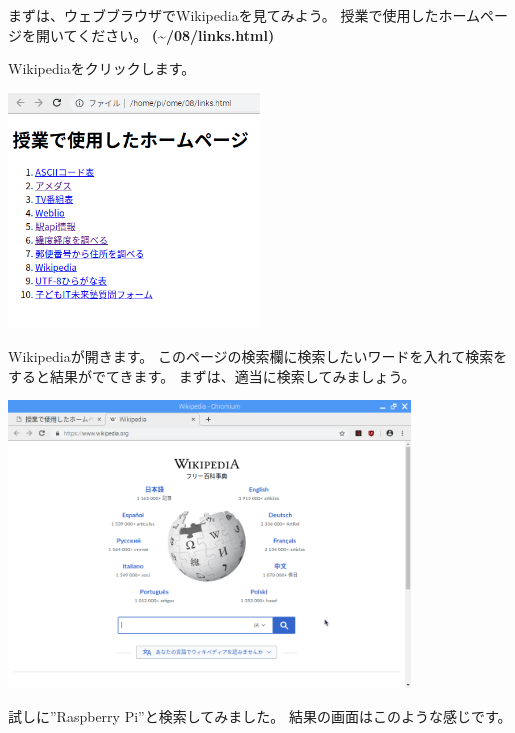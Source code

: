 まずは、ウェブブラウザでWikipediaを見てみよう。
授業で使用したホームページを開いてください。
\textbf{({\textasciitilde}/08/links.html)}

Wikipediaをクリックします。



\begin{center}
\includegraphics[width=0.5\textwidth]{./text08-img/textbook-img017.png}

\end{center}


Wikipediaが開きます。
このページの検索欄に検索したいワードを入れて検索をすると結果がでてきます。
まずは、適当に検索してみましょう。



\begin{center}
\includegraphics[width=0.8\textwidth]{./text08-img/textbook-img058.png}

\end{center}
\clearpage
試しに”Raspberry
Pi”と検索してみました。
結果の画面はこのような感じです。



